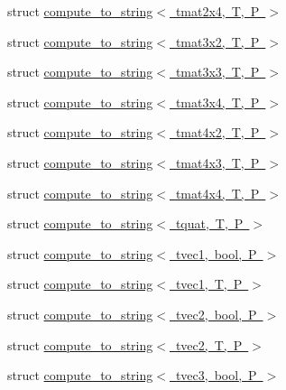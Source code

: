\begin{DoxyCompactItemize}
\item 
struct \mbox{\hyperlink{structglm_1_1detail_1_1compute__to__string_3_01tmat2x4_00_01_t_00_01_p_01_4}{compute\+\_\+to\+\_\+string$<$ tmat2x4, T, P $>$}}
\item 
struct \mbox{\hyperlink{structglm_1_1detail_1_1compute__to__string_3_01tmat3x2_00_01_t_00_01_p_01_4}{compute\+\_\+to\+\_\+string$<$ tmat3x2, T, P $>$}}
\item 
struct \mbox{\hyperlink{structglm_1_1detail_1_1compute__to__string_3_01tmat3x3_00_01_t_00_01_p_01_4}{compute\+\_\+to\+\_\+string$<$ tmat3x3, T, P $>$}}
\item 
struct \mbox{\hyperlink{structglm_1_1detail_1_1compute__to__string_3_01tmat3x4_00_01_t_00_01_p_01_4}{compute\+\_\+to\+\_\+string$<$ tmat3x4, T, P $>$}}
\item 
struct \mbox{\hyperlink{structglm_1_1detail_1_1compute__to__string_3_01tmat4x2_00_01_t_00_01_p_01_4}{compute\+\_\+to\+\_\+string$<$ tmat4x2, T, P $>$}}
\item 
struct \mbox{\hyperlink{structglm_1_1detail_1_1compute__to__string_3_01tmat4x3_00_01_t_00_01_p_01_4}{compute\+\_\+to\+\_\+string$<$ tmat4x3, T, P $>$}}
\item 
struct \mbox{\hyperlink{structglm_1_1detail_1_1compute__to__string_3_01tmat4x4_00_01_t_00_01_p_01_4}{compute\+\_\+to\+\_\+string$<$ tmat4x4, T, P $>$}}
\item 
struct \mbox{\hyperlink{structglm_1_1detail_1_1compute__to__string_3_01tquat_00_01_t_00_01_p_01_4}{compute\+\_\+to\+\_\+string$<$ tquat, T, P $>$}}
\item 
struct \mbox{\hyperlink{structglm_1_1detail_1_1compute__to__string_3_01tvec1_00_01bool_00_01_p_01_4}{compute\+\_\+to\+\_\+string$<$ tvec1, bool, P $>$}}
\item 
struct \mbox{\hyperlink{structglm_1_1detail_1_1compute__to__string_3_01tvec1_00_01_t_00_01_p_01_4}{compute\+\_\+to\+\_\+string$<$ tvec1, T, P $>$}}
\item 
struct \mbox{\hyperlink{structglm_1_1detail_1_1compute__to__string_3_01tvec2_00_01bool_00_01_p_01_4}{compute\+\_\+to\+\_\+string$<$ tvec2, bool, P $>$}}
\item 
struct \mbox{\hyperlink{structglm_1_1detail_1_1compute__to__string_3_01tvec2_00_01_t_00_01_p_01_4}{compute\+\_\+to\+\_\+string$<$ tvec2, T, P $>$}}
\item 
struct \mbox{\hyperlink{structglm_1_1detail_1_1compute__to__string_3_01tvec3_00_01bool_00_01_p_01_4}{compute\+\_\+to\+\_\+string$<$ tvec3, bool, P $>$}}
\item 

\end{DoxyCompactItemize}
